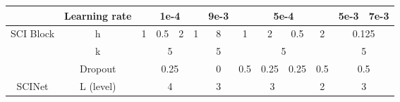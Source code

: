 \documentclass{article}
\begin{document}
\begin{table*}[h]
{\begin{tabular}{ccclllclllclllclll}
\multicolumn{1}{c|}{}                                & \multicolumn{1}{c|}{Learning rate}                        & \multicolumn{4}{c|}{1e-4}                                                                           & \multicolumn{4}{c|}{9e-3}                                                                           & \multicolumn{4}{c|}{5e-4}                                                                           & \multicolumn{3}{c|}{5e-3}    & \multicolumn{1}{c}{7e-3}                                                                      \\ \hline
\multicolumn{1}{c|}{\multirow{3}{*}{SCI Block}}      & \multicolumn{1}{c|}{h}                                    & \multicolumn{1}{c|}{1}   & \multicolumn{1}{c|}{0.5}& \multicolumn{1}{c|}{2}& \multicolumn{1}{c|}{1}                                                                           & \multicolumn{4}{c|}{8}                                                                              & \multicolumn{1}{c|}{1}   & \multicolumn{1}{c|}{2}& \multicolumn{1}{c|}{0.5}& \multicolumn{1}{c|}{2}                                                                           & \multicolumn{4}{c}{0.125}                                                                         \\ \cline{2-18} 
\multicolumn{1}{c|}{}                                & \multicolumn{1}{c|}{k}                                    & \multicolumn{4}{c|}{5}                                                                              & \multicolumn{4}{c|}{5}                                                                              & \multicolumn{4}{c|}{5}                                                                              & \multicolumn{4}{c}{5}                                                                             \\ \cline{2-18}
\multicolumn{1}{c|}{}                                & \multicolumn{1}{c|}{Dropout}                                    & \multicolumn{4}{c|}{0.25}                                                                              & \multicolumn{4}{c|}{0}                                                                              & \multicolumn{1}{c|}{0.5}         & \multicolumn{1}{c|}{0.25} & \multicolumn{1}{c|}{0.25} & \multicolumn{1}{c|}{0.5}                                                                     & \multicolumn{4}{c}{0.5}                                                                             \\ \hline
\multicolumn{1}{c|}{SCINet}                          & \multicolumn{1}{c|}{L (level)}                            & \multicolumn{4}{c|}{4}                                                                              & \multicolumn{4}{c|}{3}                                                                              & \multicolumn{3}{c|}{3}  & \multicolumn{1}{c|}{2}                                                                            & \multicolumn{4}{c}{3}                                                                             \\ \hline

\end{tabular}}
\end{table*}
\end{document}
